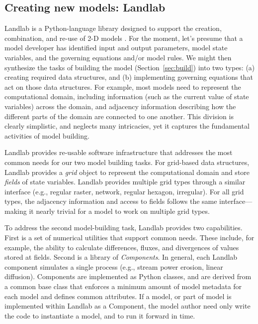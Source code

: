\documentclass[12pt]{amsart}
\begin{document}
\subsection{Creating new models: Landlab}

Landlab is a Python-language library designed to support the creation, combination, and re-use of 2-D models \citep{hobley2017creative, barnhart2020short}. For the moment, let's presume that a model developer has identified input and output parameters, model state variables, and the governing equations and/or model rules. We might then synthesize the tasks of building the model (Section~\ref{sec:build}) into two types: (a) creating required data structures, and (b) implementing governing equations that act on those data structures. For example, most models need to represent the computational domain, including information (such as the current value of state variables) across the domain, and adjacency information describing how the different parts of the domain are connected to one another. This division is clearly simplistic, and neglects many intricacies, yet it captures the fundamental activities of model building. 

Landlab provides re-usable software infrastructure that addresses the most common needs for our two model building tasks. For grid-based data structures, Landlab provides a \textit{grid} object to represent the computational domain and store \textit{fields} of state variables. Landlab provides multiple grid types through a similar interface (e.g., regular raster, network, regular hexagon, irregular). For all grid types, the adjacency information and access to fields follows the same interface---making it nearly trivial for a model to work on multiple grid types. 

To address the second model-building task, Landlab provides two capabilities. First is a set of numerical utilities that support common needs. These include, for example, the ability to calculate differences, fluxes, and divergences of values stored at fields. Second is a library of \textit{Components}. In general, each Landlab component simulates a single process (e.g., stream power erosion, linear diffusion). Components are implemented as Python classes, and are derived from a common base class that enforces a minimum amount of model metadata for each model and defines common attributes. If a model, or part of model is implemented within Landlab as a Component, the model author need only write the code to instantiate a model, and to run it forward in time.
\end{document}
